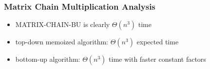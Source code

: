 \documentclass{beamer}
\begin{document}
\begin{frame} \frametitle{Matrix Chain Multiplication Analysis}
  \begin{itemize}
    \item MATRIX-CHAIN-BU is clearly $\Theta(n^3)$ time
    \item top-down memoized algorithm: $\Theta(n^3)$ expected time
    \item bottom-up algorithm: $\Theta(n^3)$ time with faster constant factors
  \end{itemize}
\end{frame}
\end{document}
